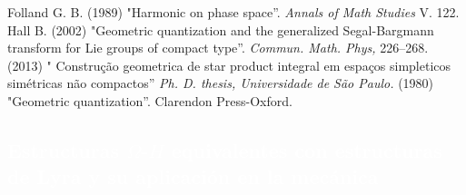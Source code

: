 \begin{titlepage}
\begin{thebibliography}{99}
 {\sc Folland G. B.} (1989) "Harmonic on phase space''. \emph{Annals of Math Studies} V. 122.
 {\sc Hall B.} (2002) "Geometric quantization and the generalized Segal-Bargmann transform for Lie groups of compact type''.
    \emph{Commun. Math. Phys,} 226--268.
 (2013) " Constru\c{c}\~ao geometrica de star product integral em espa\c{c}os simpleticos sim\'etricas n\~ao compactos''    \emph{Ph. D. thesis, Universidade de S\~ao Paulo.}
 (1980) "Geometric quantization''. Clarendon Press-Oxford.
\end{thebibliography}
\end{titlepage}
\begin{titlepage}
\author{%
\\
    Richard Malav\'e\\
     Departamento de Matem\'{a}ticas. Universidad de Oriente. Cuman\'{a}. Venezuela\\
      \texttt{\footnotesize
       rmalaveg@gmail.com}\vspace{10pt}\\
         }
\newcommand{\N}{\mathbb{N}}
\newcommand{\R}{\mathbb{R}}
\newcommand{\Z}{\mathbb{Z}}
\newcommand{\Bd}{\mathrm{Bd}}
\newcommand{\Int}{\mathrm{Int}}
\newcommand{\diam}{\mathrm{diam}}
\newcommand{\Cl}{\mathrm{Cl}}
\newcommand{\A}{\mathrm{A}}

\pagecolor{white}
\BgThispage
{}
\vspace*{-1.1cm}
\noindent
\def\titulo#1{\section{#1}}
\section{\bf\large\textcolor{white}{Estructuras $\Omega$-$H$ equivalentes con estructuras de Lyra y su aplicaci\'on en la mec\'anica}}
\vspace*{2cm}\par
\noindent


\end{titlepage}
